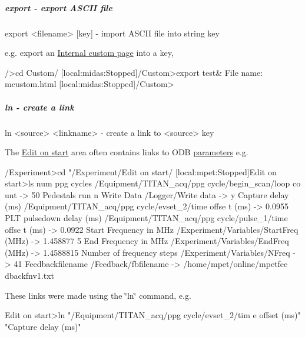 \hypertarget{RC_odbedit_examples_RC_odbedit_export}{}\subparagraph{export -\/  export ASCII file}\label{RC_odbedit_examples_RC_odbedit_export}

\begin{DoxyCode}
export  <filename> [key]    - import ASCII file into string key 
\end{DoxyCode}


e.g. export an \hyperlink{RC_mhttpd_Internal}{Internal custom page} into a key,


\begin{DoxyCode}
  />cd Custom/
  [local:midas:Stopped]/Custom>export test&
  File name: mcustom.html
  [local:midas:Stopped]/Custom>
\end{DoxyCode}




\hypertarget{RC_odbedit_examples_RC_odbedit_ln}{}\subparagraph{ln -\/ create a link}\label{RC_odbedit_examples_RC_odbedit_ln}

\begin{DoxyCode}
ln <source> <linkname>  - create a link to <source> key
\end{DoxyCode}


The \hyperlink{RC_customize_ODB_RC_Edit_On_Start}{Edit on start} area often contains links to ODB \hyperlink{structparameters}{parameters} e.g. 
\begin{DoxyCode}
/Experiment>cd "/Experiment/Edit on start/
[local:mpet:Stopped]Edit on start>ls
num ppg cycles                  /Equipment/TITAN_acq/ppg cycle/begin_scan/loop co
      unt -> 50
Pedestals run                   n
Write Data                      /Logger/Write data -> y
Capture delay (ms)              /Equipment/TITAN_acq/ppg cycle/evset_2/time offse
      t (ms) -> 0.0955
PLT pulsedown delay (ms)        /Equipment/TITAN_acq/ppg cycle/pulse_1/time offse
      t (ms) -> 0.0922
Start Frequency in MHz          /Experiment/Variables/StartFreq (MHz) -> 1.458877
      5
End Frequency in MHz            /Experiment/Variables/EndFreq (MHz) -> 1.4588815
Number of frequency steps       /Experiment/Variables/NFreq -> 41
Feedbackfilename                /Feedback/fbfilename -> /home/mpet/online/mpetfee
      dbackfnv1.txt
\end{DoxyCode}


These links were made using the \char`\"{}ln\char`\"{} command, e.g. 
\begin{DoxyCode}
Edit on start>ln  "/Equipment/TITAN_acq/ppg cycle/evset_2/tim
      e offset (ms)" "Capture delay (ms)"
\end{DoxyCode}




